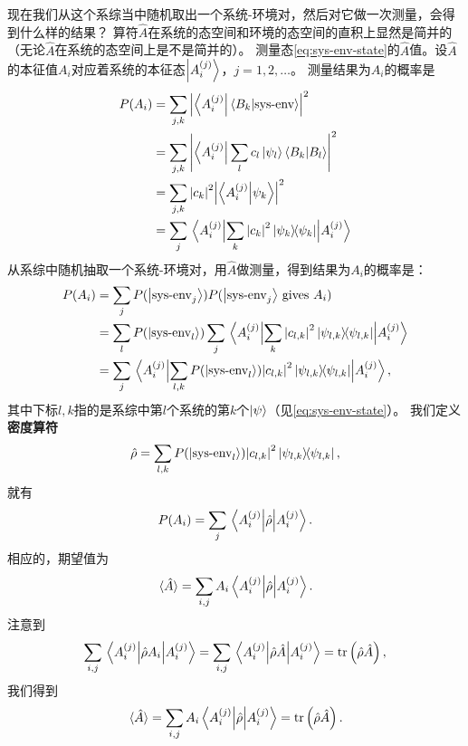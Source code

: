 \documentclass[hyperref, UTF8, a4paper]{ctexart}
\begin{document}
现在我们从这个系综当中随机取出一个系统-环境对，然后对它做一次测量，会得到什么样的结果？
算符$\hat{A}$在系统的态空间和环境的态空间的直积上显然是简并的（无论$\hat{A}$在系统的态空间上是不是简并的）。
测量态\eqref{eq:sys-env-state}的$\hat{A}$值。设$\hat{A}$的本征值$A_i$对应着系统的本征态$\ket{A_i^{(j)}}$，$j=1, 2, \ldots$。
测量结果为$A_i$的概率是
\[
    \begin{aligned}
        P(A_i) &= \sum_{j,k} \abs{\bra{A_i^{(j)}} \bra{B_k} \ket{\text{sys-env}}}^2 \\
        &= \sum_{j, k} \abs{ \bra{A_i^{(j)}} \sum_l c_l \ket{\psi_l} \braket{B_k}{B_l} }^2 \\
        &= \sum_{j, k} \abs{c_k}^2 \abs{\braket{A_i^{(j)}}{{\psi_k}}}^2 \\
        &= \sum_j \ev{ \sum_k \abs{c_k}^2 \dyad{\psi_k} }{A_i^{(j)}}
    \end{aligned}
\]
从系综中随机抽取一个系统-环境对，用$\hat{A}$做测量，得到结果为$A_i$的概率是：
\[
    \begin{aligned}
        P(A_i) &= \sum_j P(\ket{\text{sys-env}_j}) P(\text{$\ket{\text{sys-env}_j}$ gives $A_i$}) \\
        &= \sum_l P(\ket{\text{sys-env}_l}) \sum_j \ev{ \sum_k \abs{c_{l, k}}^2 \dyad{\psi_{l, k}} }{A_i^{(j)}} \\
        &= \sum_j \ev{ \sum_{l, k} P(\ket{\text{sys-env}_l}) \abs{c_{l, k}}^2 \dyad{\psi_{l, k}} }{A_i^{(j)}},
    \end{aligned}
\]
其中下标$l, k$指的是系综中第$l$个系统的第$k$个$\ket{\psi}$（见\eqref{eq:sys-env-state}）。
我们定义\textbf{密度算符}
\begin{equation}
    \hat{\rho} = \sum_{l, k} P(\ket{\text{sys-env}_l}) \abs{c_{l, k}}^2 \dyad{\psi_{l, k}},
    \label{eq:density-operator-def}
\end{equation}
就有
\begin{equation}
    P(A_i) = \sum_j \ev{\hat{\rho}}{A_i^{(j)}}.
    \label{eq:prop-of-quantity}
\end{equation}
相应的，期望值为
\[
    \expval*{\hat{A}} = \sum_{i, j} A_i \ev{\hat{\rho}}{A_i^{(j)}}.
\]
注意到
\[
    \sum_{i, j} \ev{\hat{\rho} A_i }{A_i^{(j)}} = \sum_{i, j} \ev{\hat{\rho} \hat{A} }{A_i^{(j)}} = \trace \left(\hat{\rho} \hat{A}\right),
\]
我们得到
\begin{equation}
    \expval*{\hat{A}} = \sum_{i, j} A_i \ev{\hat{\rho}}{A_i^{(j)}} = \trace \left(\hat{\rho} \hat{A}\right).
    \label{eq:expectation}
\end{equation}
\end{document}
